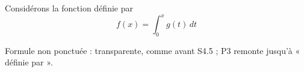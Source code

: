 Considérons la fonction définie par
\begin{equation}
  f(x) = \int_0^x g(t) \, dt
\end{equation}
\begin{proposition} %
  Formule non ponctuée : transparente, comme avant S4.5 ; P3 remonte jusqu'à
  « définie par ».
\end{proposition}
